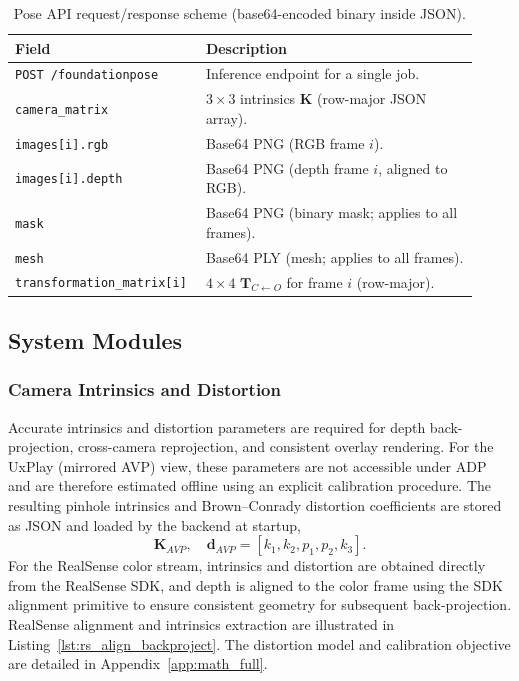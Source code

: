 \begin{table}[H]
\centering
\caption{Pose API request/response scheme (base64-encoded binary inside JSON).}
\label{tab:pose_api_io}
\begin{tabular}{p{0.34\linewidth}p{0.58\linewidth}}
\toprule
\textbf{Field} & \textbf{Description} \\
\midrule
\texttt{POST /foundationpose} & Inference endpoint for a single job. \\
\texttt{camera\_matrix} & $3\times 3$ intrinsics $\mathbf{K}$ (row-major JSON array). \\
\texttt{images[i].rgb} & Base64 PNG (RGB frame $i$). \\
\texttt{images[i].depth} & Base64 PNG (depth frame $i$, aligned to RGB). \\
\texttt{mask} & Base64 PNG (binary mask; applies to all frames). \\
\texttt{mesh} & Base64 PLY (mesh; applies to all frames). \\
\texttt{transformation\_matrix[i]} & $4\times 4$ $\mathbf{T}_{C \leftarrow O}$ for frame $i$ (row-major). \\
\bottomrule
\end{tabular}
\end{table}
\subsection{System Modules}

\subsubsection{Camera Intrinsics and Distortion}
\label{subsec:impl_calibration}
Accurate intrinsics and distortion parameters are required for depth back-projection, cross-camera reprojection, and consistent overlay rendering. For the UxPlay (mirrored AVP) view, these parameters are not accessible under ADP and are therefore estimated offline using an explicit calibration procedure. The resulting pinhole intrinsics and Brown--Conrady distortion coefficients are stored as JSON and loaded by the backend at startup,
\[
\mathbf{K}_{AVP}, \quad \mathbf{d}_{AVP} = [k_1,k_2,p_1,p_2,k_3].
\]
For the RealSense color stream, intrinsics and distortion are obtained directly from the RealSense SDK, and depth is aligned to the color frame using the SDK alignment primitive to ensure consistent geometry for subsequent back-projection. RealSense alignment and intrinsics extraction are illustrated in Listing~\ref{lst:rs_align_backproject}. The distortion model and calibration objective are detailed in Appendix~\ref{app:math_full}.

